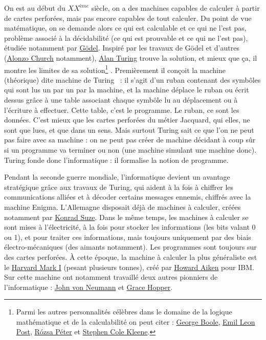 \documentclass[10pt]{article}
\begin{document}
On est au début du $XX^{\mathit{ème}}$ siècle, on a des machines capables de calculer à partir de cartes perforées, mais pas encore capables
de tout calculer. Du point de vue matématique, on se demande alors ce qui est calculable et ce qui ne l'est pas, problème associé
à la décidabilité (ce qui est prouvable et ce qui ne l'est pas), étudiée notamment par \href{https://fr.wikipedia.org/wiki/Kurt_G\%C3\%B6del}{Gödel}.
Inspiré par les travaux de Gödel et d'autres (\href{https://fr.wikipedia.org/wiki/Alonzo_Church}{Alonzo Church}
notamment), \href{https://fr.wikipedia.org/wiki/Alan_Turing}{Alan Turing} trouve
la solution, et mieux que ça, il montre les limites de sa solution\footnote{
  Parmi les autres personnalités célèbres dans le domaine de la logique mathématique et de la calculabilité on peut citer :
  \href{https://fr.wikipedia.org/wiki/George_Boole}{George Boole},
  \href{https://fr.wikipedia.org/wiki/Emil_Post}{Emil Leon Post},
  \href{https://fr.wikipedia.org/wiki/R\%C3\%B3zsa_P\%C3\%A9ter}{Rózsa Péter} et
  \href{https://fr.wikipedia.org/wiki/Stephen_Cole_Kleene}{Stephen Cole Kleene}.
}
. Premièrement il conçoit la machine (théorique) dite \og machine de Turing \fg~:
il s'agit d'un ruban contenant des symbôles qui sont lus un par un par la machine, et la machine déplace le ruban ou écrit dessus
grâce à une table associant chaque symbôle lu au déplacement ou à l'écriture à effectuer.
Cette table, c'est le programme. Le ruban, ce sont les données.
C'est mieux que les cartes perforées du métier Jacquard, qui elles, ne sont que lues, et que dans un sens. Mais surtout
Turing sait ce que l'on ne peut pas faire avec sa machine : on ne peut pas créer de machine décidant à coup sûr
si un programme va terminer ou non (une machine simulant une machine donc). Turing fonde donc l'informatique :
il formalise la notion de programme.


Pendant la seconde guerre mondiale, l'informatique devient un avantage stratégique grâce aux travaux de Turing,
qui aident à la fois à chiffrer les communications alliées et à décoder certains messages ennemis, chiffrés avec la machine Enigma.
L'Allemagne disposait déjà de machines à calculer, créées notamment par \href{https://fr.wikipedia.org/wiki/Konrad_Zuse}{Konrad Suze}.
Dans le même temps, les machines à calculer se sont mises à l'électricité, à la fois pour stocker les informations (les bits valant 0 ou 1),
et pour traiter ces informations, mais toujours uniquement par des biais électro-mécaniques (des aimants notamment).
Les programmes sont toujours sur des cartes perforées. À cette époque,
la machine à calculer la plus généraliste est le \href{https://fr.wikipedia.org/wiki/Harvard_Mark_I}{Harvard Mark I} (pesant plusieurs tonnes), créé par
\href{https://en.wikipedia.org/wiki/Howard_H._Aiken}{Howard Aiken} pour IBM.
Sur cette machine ont notamment travaillé deux autres pionniers de l'informatique : \href{https://fr.wikipedia.org/wiki/John_von_Neumann}{John von Neumann}
et \href{https://fr.wikipedia.org/wiki/Grace_Hopper}{Grace Hopper}.
\end{document}
